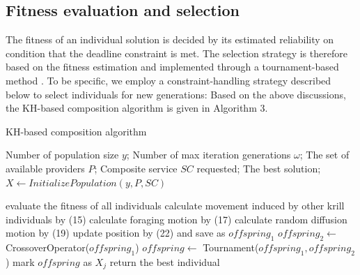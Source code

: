 \documentclass[journal]{IEEEtran}
\begin{document}
\subsection{Fitness evaluation and selection}
The fitness of an individual solution is decided by its estimated reliability on condition that the deadline constraint is met.
The selection strategy is therefore based on the fitness estimation and implemented through a tournament-based method \cite{whitley1994genetic}. To be specific, we employ a constraint-handling strategy described below to select individuals for new generations: 
{\color{blue}{1) if the $\tau$ values of two solutions meet the user-defined deadline, then discard the one with lower estimated reliability, 2) if the $\tau$ value of only one solution meets the deadline, then discard the unsatisfied one; and 3) if the $\tau$ values of both solutions exceed the deadline, then discard the one with lower}}
{\color{blue}{estimated reliability.}}
Based on the above discussions, the KH-based composition algorithm is given in Algorithm 3.

\begin{algorithm}
\caption{KH-based composition algorithm}
\label{KH}
\begin{algorithmic}[1]

\REQUIRE Number of population size $y$; Number of max iteration generations $\omega$; The set of available providers $P$;  Composite service $SC$ requested;
\ENSURE The best solution;
\STATE $X \leftarrow InitializePopulation(y,P,SC)$

  \STATE evaluate the fitness of all individuals
    \STATE calculate movement induced by other krill individuals by (15)
    \STATE calculate foraging motion by (17)
    \STATE calculate random diffusion motion by (19)
    \STATE update position by (22) and save as $offspring_1$
    \STATE $offspring_2 \leftarrow $ CrossoverOperator($offspring_1$)
    \STATE $offspring \leftarrow $ Tournament($offspring_1, offspring_2$)
    \STATE mark $offspring$ as $X_j$
  \ENDFOR
\ENDFOR
\STATE return the best individual
\end{algorithmic}
\end{algorithm}
\end{document}
